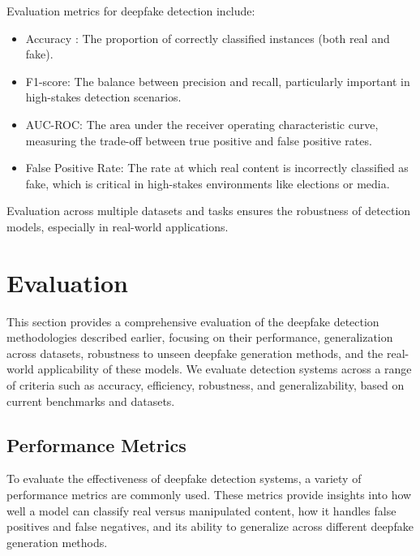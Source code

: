 \documentclass[lettersize,journal]{IEEEtran}
\begin{document}
Evaluation metrics for deepfake detection include:

\begin{itemize}
    \item Accuracy : The proportion of correctly classified instances (both real and fake).

    \item F1-score: The balance between precision and recall, particularly important in high-stakes detection scenarios.
    
    \item AUC-ROC: The area under the receiver operating characteristic curve, measuring the trade-off between true positive and false positive rates.
\cite{javed2025enhancing}
    \item False Positive Rate: The rate at which real content is incorrectly classified as fake, which is critical in high-stakes environments like elections or media.
\end{itemize}

\noindent Evaluation across multiple datasets and tasks ensures the robustness of detection models, especially in real-world applications.\cite{pei2024deepfake}









\section{Evaluation}
\noindent This section provides a comprehensive evaluation of the deepfake detection methodologies described earlier, focusing on their performance, generalization across datasets, robustness to unseen deepfake generation methods, and the real-world applicability of these models. We evaluate detection systems across a range of criteria such as accuracy, efficiency, robustness, and generalizability, based on current benchmarks and datasets.

\cite{jiang2025robust}
\subsection{ Performance Metrics}

\noindent To evaluate the effectiveness of deepfake detection systems, a variety of performance metrics are commonly used. These metrics provide insights into how well a model can classify real versus manipulated content, how it handles false positives and false negatives, and its ability to generalize across different deepfake generation methods.
\end{document}
